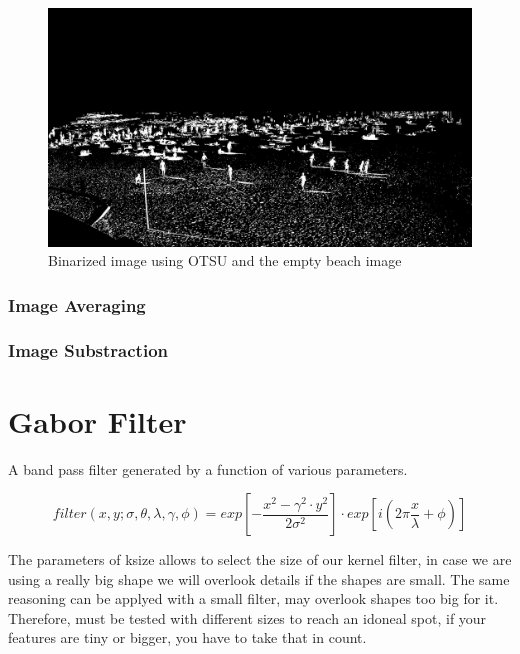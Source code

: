 \documentclass[11pt]{article}
\begin{document}
\begin{figure}[h]
    \centering
    \includegraphics[width=\textwidth]{img/OTSU_sub_arena.jpg}
    \caption{Binarized image using OTSU and the empty beach image}
    \label{fig:y equals x}
\end{figure}

\subsubsection{Image Averaging}



\subsubsection{Image Substraction}


\section{Gabor Filter}



A band pass filter generated by a function of various parameters.

\begin{equation}
    filter(x,y;\sigma,\theta,\lambda,\gamma,\phi) = exp [ - \frac{x^2 - \gamma ^2 \cdot y^2}{2 \sigma^2} ] \cdot exp [ i (2 \pi \frac{x}{\lambda} + \phi) ] 
\end{equation}


The parameters of ksize allows to select the size of our kernel filter, in case we are using a really big shape we will overlook details if the shapes are small. The same reasoning can be applyed with a small filter, may overlook shapes too big for it. Therefore, must be tested with different sizes to reach an idoneal spot, if your features are tiny or bigger, you have to take that in count.
\end{document}
